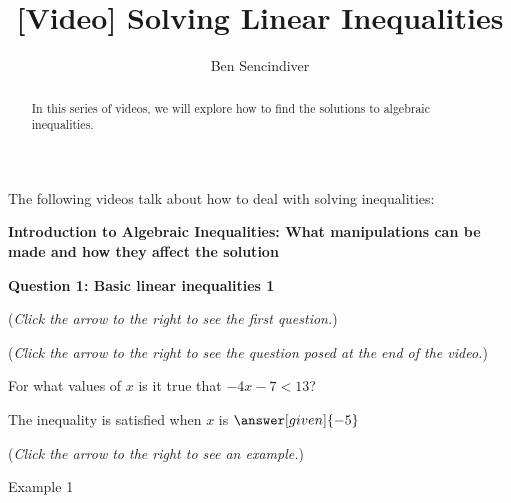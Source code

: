 \documentclass{ximera}
\title[Prerequisite Videos: ]{[Video] Solving Linear Inequalities}
\author{Ben Sencindiver}
\begin{document}
\begin{abstract}
  In this series of videos, we will explore how to find the solutions
  to algebraic inequalities. 
\end{abstract}
\maketitle

The following videos talk about how to deal with solving inequalities:


\textbf{Introduction to Algebraic Inequalities: What manipulations
can be made and how they affect the solution}



\textbf{Question 1: Basic linear inequalities 1}
\begin{question}
\begin{center}
{\color{blue}(\emph{Click the arrow to the right to see the first question.})}
\end{center}
\begin{expandable}
\begin{center}
\end{center}
\begin{flushright}
{\color{blue}(\emph{Click the arrow to the right to see the question
posed at the end of the video.})}
\end{flushright}
\begin{expandable}
\begin{center}
For what values of $x$ is it true that $-4x-7 <13$?\\
\end{center}
\begin{prompt}
\begin{center}
The inequality is satisfied when $x$ is  $\answer[given]{-5}$\\
\end{center}
\end{prompt}
\begin{flushright}
{\color{blue}(\emph{Click the arrow to the right to see an example.})}
\end{flushright}
\begin{expandable}
\begin{center}
\begin{center}
Example 1
\end{center}
\end{center}
\end{expandable}
\end{expandable}
\end{expandable}
\end{question}
\end{document}
